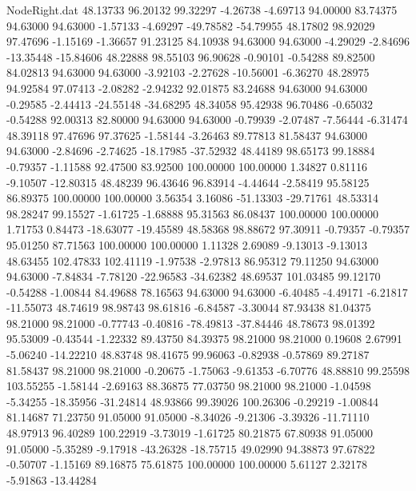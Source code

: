 \begin{filecontents}{NodeRight.dat}
  48.13733   96.20132   99.32297    -4.26738   -4.69713   94.00000   83.74375   94.63000   94.63000   -1.57133   -4.69297  -49.78582  -54.79955
  48.17802   98.92029   97.47696    -1.15169   -1.36657   91.23125   84.10938   94.63000   94.63000   -4.29029   -2.84696  -13.35448  -15.84606
  48.22888   98.55103   96.90628    -0.90101   -0.54288   89.82500   84.02813   94.63000   94.63000   -3.92103   -2.27628  -10.56001   -6.36270
  48.28975   94.92584   97.07413    -2.08282   -2.94232   92.01875   83.24688   94.63000   94.63000   -0.29585   -2.44413  -24.55148  -34.68295
  48.34058   95.42938   96.70486    -0.65032   -0.54288   92.00313   82.80000   94.63000   94.63000   -0.79939   -2.07487   -7.56444   -6.31474
  48.39118   97.47696   97.37625    -1.58144   -3.26463   89.77813   81.58437   94.63000   94.63000   -2.84696   -2.74625  -18.17985  -37.52932
  48.44189   98.65173   99.18884    -0.79357   -1.11588   92.47500   83.92500  100.00000  100.00000    1.34827    0.81116   -9.10507  -12.80315
  48.48239   96.43646   96.83914    -4.44644   -2.58419   95.58125   86.89375  100.00000  100.00000    3.56354    3.16086  -51.13303  -29.71761
  48.53314   98.28247   99.15527    -1.61725   -1.68888   95.31563   86.08437  100.00000  100.00000    1.71753    0.84473  -18.63077  -19.45589
  48.58368   98.88672   97.30911    -0.79357   -0.79357   95.01250   87.71563  100.00000  100.00000    1.11328    2.69089   -9.13013   -9.13013
  48.63455  102.47833  102.41119    -1.97538   -2.97813   86.95312   79.11250   94.63000   94.63000   -7.84834   -7.78120  -22.96583  -34.62382
  48.69537  101.03485   99.12170    -0.54288   -1.00844   84.49688   78.16563   94.63000   94.63000   -6.40485   -4.49171   -6.21817  -11.55073
  48.74619   98.98743   98.61816    -6.84587   -3.30044   87.93438   81.04375   98.21000   98.21000   -0.77743   -0.40816  -78.49813  -37.84446
  48.78673   98.01392   95.53009    -0.43544   -1.22332   89.43750   84.39375   98.21000   98.21000    0.19608    2.67991   -5.06240  -14.22210
  48.83748   98.41675   99.96063    -0.82938   -0.57869   89.27187   81.58437   98.21000   98.21000   -0.20675   -1.75063   -9.61353   -6.70776
  48.88810   99.25598  103.55255    -1.58144   -2.69163   88.36875   77.03750   98.21000   98.21000   -1.04598   -5.34255  -18.35956  -31.24814
  48.93866   99.39026  100.26306    -0.29219   -1.00844   81.14687   71.23750   91.05000   91.05000   -8.34026   -9.21306   -3.39326  -11.71110
  48.97913   96.40289  100.22919    -3.73019   -1.61725   80.21875   67.80938   91.05000   91.05000   -5.35289   -9.17918  -43.26328  -18.75715
  49.02990   94.38873   97.67822    -0.50707   -1.15169   89.16875   75.61875  100.00000  100.00000    5.61127    2.32178   -5.91863  -13.44284

\end{filecontents}
